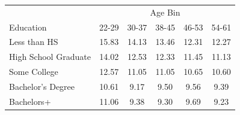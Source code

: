 \begin{tabular}{lccccc}
\hline\hline
 & \multicolumn{5}{c}{Age Bin} \\
Education & 22-29 & 30-37 & 38-45 & 46-53 & 54-61 \\
\hline
Less than HS&15.83&14.13&13.46&12.31&12.27\\
High School Graduate&14.02&12.53&12.33&11.45&11.13\\
Some College&12.57&11.05&11.05&10.65&10.60\\
Bachelor's Degree&10.61&9.17&9.50&9.56&9.39\\
Bachelors+&11.06&9.38&9.30&9.69&9.23\\
\hline\hline
\end{tabular}
